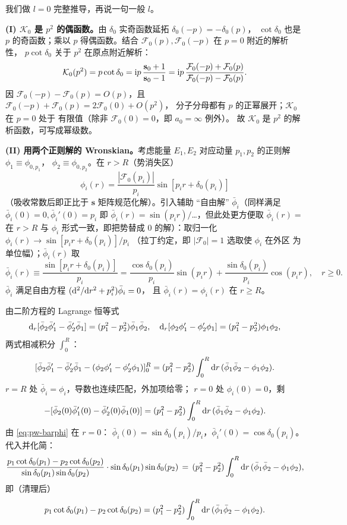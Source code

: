 \begin{proof*}[证明]
我们做 $l=0$ 完整推导，再说一句一般 $l$。

\textbf{(I) $\mathcal K_0$ 是 $p^2$ 的偶函数。}由
$\delta_0$ 实奇函数延拓 $\delta_0(-p)=-\delta_0(p)$，
$\cot\delta_0$ 也是 $p$ 的奇函数；乘以 $p$ 得偶函数。结合
$\mathcal F_0(p),\mathcal F_0(-p)$ 在 $p=0$ 附近的解析性，
$p\cot\delta_0$ 关于 $p^2$ 在原点附近解析：
\[
\mathcal K_0(p^2)=p\cot\delta_0
= \mathrm{i} p\,\frac{\mathbf s_0+1}{\mathbf s_0-1}
= \mathrm{i} p\,\frac{\mathcal F_0(-p)+\mathcal F_0(p)}
              {\mathcal F_0(-p)-\mathcal F_0(p)}.
\]
因 $\mathcal F_0(-p)-\mathcal F_0(p)=O(p)$，且
$\mathcal F_0(-p)+\mathcal F_0(p)=2\mathcal F_0(0)+O(p^2)$，
分子分母都有 $p$ 的正幂展开；$\mathcal K_0$ 在 $p=0$ 处于
有限值（除非 $\mathcal F_0(0)=0$，即 $a_0=\infty$ 例外）。
故 $\mathcal K_0$ 是 $p^2$ 的解析函数，可写成幂级数。

\textbf{(II) 用两个正则解的 Wronskian。}考虑能量 $E_1,E_2$
对应动量 $p_1,p_2$ 的正则解 $\phi_1\equiv\phi_{0,p_1}$，
$\phi_2\equiv\phi_{0,p_2}$。在 $r>R$（势消失区）
\[
\phi_i(r)=\frac{|\mathcal F_0(p_i)|}{p_i}\sin[p_i r+\delta_0(p_i)]
\]
（吸收常数后即正比于 $\mathbf s$ 矩阵规范化解）。引入辅助
“自由解” $\bar\phi_i$（同样满足 $\bar\phi_i(0)=0,\bar\phi_i'(0)=p_i$
即 $\bar\phi_i(r)=\sin(p_i r)/$\dots，但此处更方便取
$\bar\phi_i(r)=$ 在 $r>R$ 与 $\phi_i$ 形式一致，即把势替成
$0$ 的解）：取归一化 $\phi_i(r)\to\sin[p_i r+\delta_0(p_i)]/p_i$
（拉丁约定，即 $|\mathcal F_0|=1$ 选取使 $\phi_i$ 在外区
为单位幅）；$\bar\phi_i(r)$ 取
\begin{equation}\label{eq:pw-barphi}
\bar\phi_i(r)\equiv \frac{\sin[p_i r+\delta_0(p_i)]}{p_i}
=\frac{\cos\delta_0(p_i)}{p_i}\sin(p_i r)
+\frac{\sin\delta_0(p_i)}{p_i}\cos(p_i r),\quad r\ge 0.
\end{equation}
$\bar\phi_i$ 满足自由方程 $(\mathrm{d}^2/\mathrm{d} r^2+p_i^2)\bar\phi_i=0$，
且 $\bar\phi_i(r)=\phi_i(r)$ 在 $r\ge R$。

由二阶方程的 Lagrange 恒等式
\[
\mathrm{d}_r[\bar\phi_2\bar\phi_1'-\bar\phi_2'\bar\phi_1]
=(p_1^2-p_2^2)\bar\phi_1\bar\phi_2,
\quad
\mathrm{d}_r[\phi_2\phi_1'-\phi_2'\phi_1]
=(p_1^2-p_2^2)\phi_1\phi_2,
\]
两式相减积分 $\int_0^R$：
\[
[\bar\phi_2\bar\phi_1'-\bar\phi_2'\bar\phi_1
-(\phi_2\phi_1'-\phi_2'\phi_1)]_0^R
=(p_1^2-p_2^2)\int_0^R\mathrm{d} r\,(\bar\phi_1\bar\phi_2-\phi_1\phi_2).
\]
$r=R$ 处 $\bar\phi_i=\phi_i$，导数也连续匹配，外加项给零；
$r=0$ 处 $\phi_i(0)=0$，剩
\[
-[\bar\phi_2(0)\bar\phi_1'(0)-\bar\phi_2'(0)\bar\phi_1(0)]
=(p_1^2-p_2^2)\int_0^R\mathrm{d} r\,(\bar\phi_1\bar\phi_2-\phi_1\phi_2).
\]
由 \eqref{eq:pw-barphi} 在 $r=0$：
$\bar\phi_i(0)=\sin\delta_0(p_i)/p_i$，$\bar\phi_i'(0)=\cos\delta_0(p_i)$。
代入并化简：
\begin{equation}\label{eq:pw-eff-master}
\frac{p_1\cot\delta_0(p_1)-p_2\cot\delta_0(p_2)}
     {\sin\delta_0(p_1)\sin\delta_0(p_2)}\cdot
\sin\delta_0(p_1)\sin\delta_0(p_2)
\,=\,(p_1^2-p_2^2)\int_0^R\mathrm{d} r\,(\bar\phi_1\bar\phi_2-\phi_1\phi_2),
\end{equation}
即（清理后）
\begin{equation}\label{eq:pw-eff-master-2}
p_1\cot\delta_0(p_1)-p_2\cot\delta_0(p_2)
=(p_1^2-p_2^2)\int_0^R\mathrm{d} r\,(\bar\phi_1\bar\phi_2-\phi_1\phi_2).
\end{equation}


\end{proof*}
